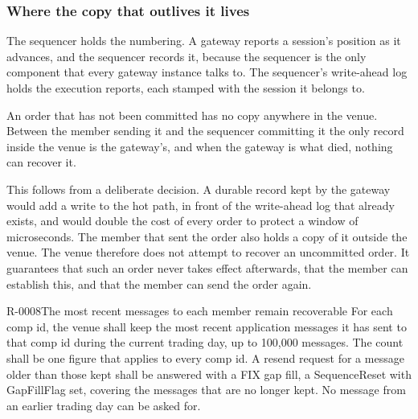 \subsubsection{Where the copy that outlives it lives}
\label{sec:ha:disabled:gateway:durable}

The sequencer holds the numbering. A gateway reports a session's position as it
advances, and the sequencer records it, because the sequencer is the only
component that every gateway instance talks to. The sequencer's write-ahead log
holds the execution reports, each stamped with the session it belongs to.

An order that has not been committed has no copy anywhere in the venue. Between
the member sending it and the sequencer committing it the only record inside the
venue is the gateway's, and when the gateway is what died, nothing can recover
it.

This follows from a deliberate decision. A durable record kept by the gateway
would add a write to the hot path, in front of the write-ahead log that already
exists, and would double the cost of every order to protect a window of
microseconds. The member that sent the order also holds a copy of it outside the
venue. The venue therefore does not attempt to recover an uncommitted order. It
guarantees that such an order never takes effect afterwards, that the member can
establish this, and that the member can send the order again.

\begin{requirement}{R-0008}{The most recent messages to each member remain recoverable}
  For each comp id, the venue shall keep the most recent application messages it
  has sent to that comp id during the current trading day, up to 100,000 messages.
  The count shall be one figure that applies to every comp id. A resend request
  for a message older than those kept shall be answered with a FIX gap fill, a
  SequenceReset with GapFillFlag set, covering the messages that are no longer
  kept. No message from an earlier trading day can be asked for.
\end{requirement}

